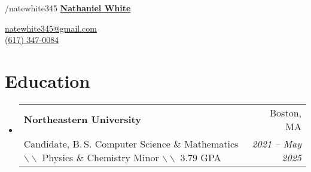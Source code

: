 \documentclass[letterpaper,11pt]{article}
\makeatletter
\newcommand{\resumeSubheadingSummary}[4]{
  \vspace{-1pt}\item
    \begin{tabular*}{0.97\textwidth}[t]{l@{\extracolsep{\fill}}r}
      \textbf{#1} & #2 \\
      \small#3 & \textit{\small #4}
    \end{tabular*}\vspace{-5pt}
}
\newcommand{\summarysep}{ \textcolor{black!50}{$ \backslash \backslash $ }}
\newcommand{\resumeSubHeadingListStart}{\begin{itemize}[leftmargin=*]}
\newcommand{\resumeSubHeadingListEnd}{\end{itemize}}
\makeatother
\begin{document}
\hypersetup{urlcolor=cyan}
\newcommand{\mysite}{www.github.com/natewhite345}
\newcommand{\myemail}{natewhite345@gmail.com}
\newcommand{\link}[2]{\color{cyan}{\underline{\href{#1}{#2}}}}
\newcommand{\headingcap}[1]{\space $|$\space \space \textit{#1}}
\newcommand{\ghlink}[1]{\href{https://www.github.com/natewhite345/#1}{
\faIcon{github}/#1}}
\newcommand{\ttull}[2]{\bgroup\markoverwith{\textcolor{cyan}{\hdashrule[-0.8ex]{1mm}{2.1pt}{1pt}}}\ULon{\href{#2}{#1}}}
\newcommand{\ttul}[1]{\bgroup\markoverwith{\textcolor{gray}{\hdashrule[-0.7ex][x]{1mm}{0.5pt}{0.5mm}}}\ULon{#1}}
\newcommand{\cttt}[3][\#]{\pdftooltip{\ttull{#2}{#1}}{#3}}
\newcommand{\ctt}[2]{\pdftooltip{\ttul{#1}}{#2}}
\newcommand{\csln}[1]{https://catalog.northeastern.edu/undergraduate/computer-information-science/computer-science/\#:~:text=#1}


\noindent %
\href{https://www.linkedin.com/in/natewhite345}{} \href{https://www.github.com/natewhite345}{}/natewhite345\hfill 
{}
\textbf{\underline{\LARGE Nathaniel White}} \href{https://orcid.org/0009-0009-0589-4481}{}\hfill 
\phantom{fffffffffffffffffffffffffffffffffff}
\vspace*{-20px}
\begin{flushright}
\href{mailto:\myemail}{\myemail}\\ \href{tel:
+016173470084}{(617) 347-0084}
\end{flushright}
\vspace*{-30pt}
\section{Education}
  \resumeSubHeadingListStart
     \resumeSubheadingSummary{Northeastern University \normalfont{$|$ Khoury College of Computer Sciences $|$ Honors}}{Boston, MA}{\BeginAccSupp{method=plain,ActualText={Candidate for a Bachelor of Science in Computer Science and Mathematics}}Candidate, B.\,S. Computer Science \& Mathematics\EndAccSupp{}\summarysep{} Physics \& Chemistry Minor \summarysep{} 3.79 GPA}{2021 -- May 2025}
   \resumeSubHeadingListEnd
\end{document}

